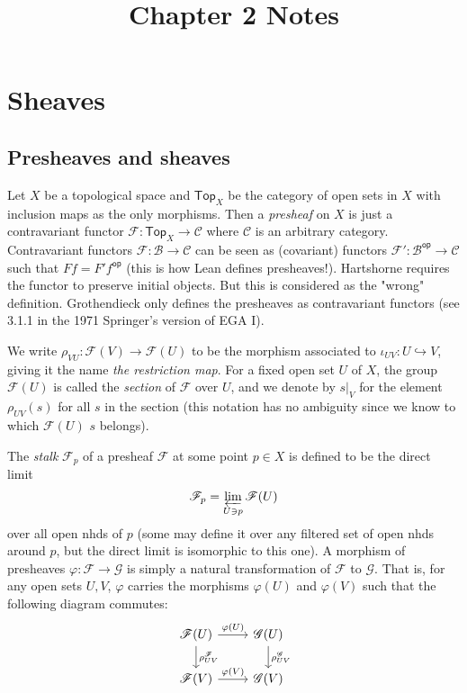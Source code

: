 \documentclass[12pt,letter]{article}
\title{Chapter 2 Notes}
\newcommand{\Top}[0]{\mathsf{Top}}
\newcommand{\op}[0]{\mathsf{op}}
\begin{document}
    \maketitle
    \tableofcontents
    \newpage
	\section{Sheaves}\label{sec-sheaf}
    \subsection{Presheaves and sheaves}\label{ssec-sheaf}
    Let $X$ be a topological space and $\Top_X$ be the category of open sets in $X$ with inclusion maps as the only morphisms. Then a \textit{presheaf} on $X$ is just a contravariant functor $\mathscr F:\Top_X\to \mathcal C$ where $\mathcal C$ is an arbitrary category. Contravariant functors $\mathscr F:\mathcal B\to\mathcal C$ can be seen as (covariant) functors $\mathscr F':\mathcal B^\op\to \mathcal C$ such that $Ff=F'f^\op$ (this is how Lean defines presheaves!). Hartshorne requires the functor to preserve initial objects. But this is considered as the "wrong" definition. Grothendieck only defines the presheaves as contravariant functors (see 3.1.1 in the 1971 Springer's version of EGA I).
    
    We write $\rho_{VU}:\mathscr F(V)\to\mathscr F(U)$ to be the morphism associated to $\iota_{UV}: U\hookrightarrow V$, giving it the name \textit{the restriction map}. For a fixed open set $U$ of $X$, the group $\mathscr F(U)$ is called the \textit{section} of $\mathscr F$ over $U$, and we denote by $s|_V$ for the element $\rho_{UV}(s)$ for all $s$ in the section (this notation has no ambiguity since we know to which $\mathscr F(U)$ $s$ belongs).
    
    The \textit{stalk} $\mathscr F_p$ of a presheaf $\mathscr F$ at some point $p\in X$ is defined to be the direct limit
    \[\mathscr F_p=\varprojlim_{U\ni p} \mathscr F(U)\] 
    over all open nhds of $p$ (some may define it over any filtered set of open nhds around $p$, but the direct limit is isomorphic to this one). A morphism of presheaves $\varphi:\mathscr F\to\mathscr G$ is simply a natural transformation of $\mathscr F$ to $\mathscr G$. That is, for any open sets $U, V$, $\varphi$ carries the morphisms $\varphi(U)$ and $\varphi(V)$ such that the following diagram commutes:
    \[
\begin{tikzcd}
\mathscr F(U) \arrow[d, "\rho_{UV}^{\mathscr F}"] \arrow[r, "\varphi(U)"] & \mathscr G(U) \arrow[d, "\rho_{UV}^{\mathscr G}"] \\
\mathscr F(V) \arrow[r, "\varphi(V)"]                                     & \mathscr G(V)                                    
\end{tikzcd}    
    \]
    
\end{document}
